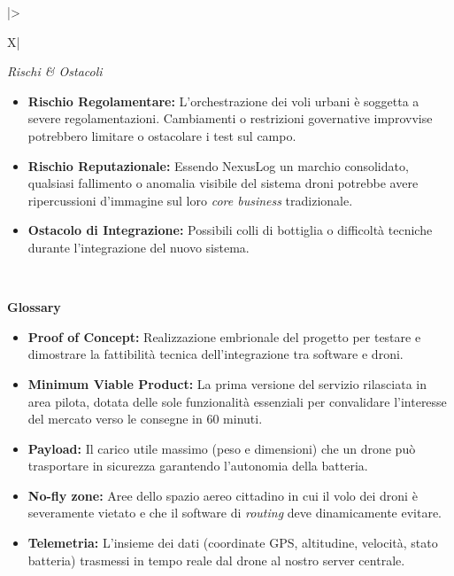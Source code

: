 \documentclass[12pt, a4paper]{article}
\begin{document}
\begin{xltabular}{\textwidth}{|>{\raggedright\arraybackslash}X|}
    \vspace{0.5em}
    \textit{Rischi \& Ostacoli}
    \begin{itemize}[leftmargin=*, noitemsep, topsep=0pt]
        \item \textbf{Rischio Regolamentare:} L'orchestrazione dei voli urbani è soggetta a severe regolamentazioni. Cambiamenti o restrizioni governative improvvise potrebbero limitare o ostacolare i test sul campo.
        \item \textbf{Rischio Reputazionale:} Essendo NexusLog un marchio consolidato, qualsiasi fallimento o anomalia visibile del sistema droni potrebbe avere ripercussioni d'immagine sul loro \textit{core business} tradizionale.
        \item \textbf{Ostacolo di Integrazione:} Possibili colli di bottiglia o difficoltà tecniche durante l'integrazione del nuovo sistema.
    \end{itemize} \\
    \hline

    \textbf{Glossary} \\
    \hline
    \begin{itemize}[leftmargin=*, noitemsep, topsep=0pt]
        \item \textbf{Proof of Concept:} Realizzazione embrionale del progetto per testare e dimostrare la fattibilità tecnica dell'integrazione tra software e droni.
        \item \textbf{Minimum Viable Product:} La prima versione del servizio rilasciata in area pilota, dotata delle sole funzionalità essenziali per convalidare l'interesse del mercato verso le consegne in 60 minuti.
        \item \textbf{Payload:} Il carico utile massimo (peso e dimensioni) che un drone può trasportare in sicurezza garantendo l'autonomia della batteria.
        \item \textbf{No-fly zone:} Aree dello spazio aereo cittadino in cui il volo dei droni è severamente vietato e che il software di \textit{routing} deve dinamicamente evitare.
        \item \textbf{Telemetria:} L'insieme dei dati (coordinate GPS, altitudine, velocità, stato batteria) trasmessi in tempo reale dal drone al nostro server centrale.
    \end{itemize} \\
    \hline
\end{xltabular}
\end{document}
